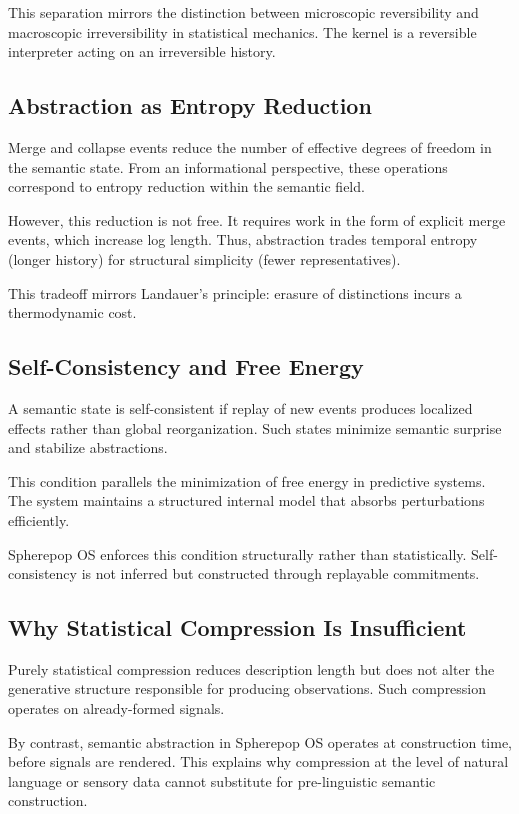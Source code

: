 \documentclass[11pt]{article}
\begin{document}
This separation mirrors the distinction between microscopic reversibility
and macroscopic irreversibility in statistical mechanics. The kernel is a
reversible interpreter acting on an irreversible history.

\subsection{Abstraction as Entropy Reduction}

Merge and collapse events reduce the number of effective degrees of
freedom in the semantic state. From an informational perspective, these
operations correspond to entropy reduction within the semantic field.

However, this reduction is not free. It requires work in the form of
explicit merge events, which increase log length. Thus, abstraction trades
temporal entropy (longer history) for structural simplicity (fewer
representatives).

This tradeoff mirrors Landauer’s principle: erasure of distinctions incurs
a thermodynamic cost.

\subsection{Self-Consistency and Free Energy}

A semantic state is self-consistent if replay of new events produces
localized effects rather than global reorganization. Such states minimize
semantic surprise and stabilize abstractions.

This condition parallels the minimization of free energy in predictive
systems. The system maintains a structured internal model that absorbs
perturbations efficiently.

Spherepop OS enforces this condition structurally rather than statistically.
Self-consistency is not inferred but constructed through replayable
commitments.

\subsection{Why Statistical Compression Is Insufficient}

Purely statistical compression reduces description length but does not
alter the generative structure responsible for producing observations.
Such compression operates on already-formed signals.

By contrast, semantic abstraction in Spherepop OS operates at construction
time, before signals are rendered. This explains why compression at the
level of natural language or sensory data cannot substitute for
pre-linguistic semantic construction.
\end{document}
